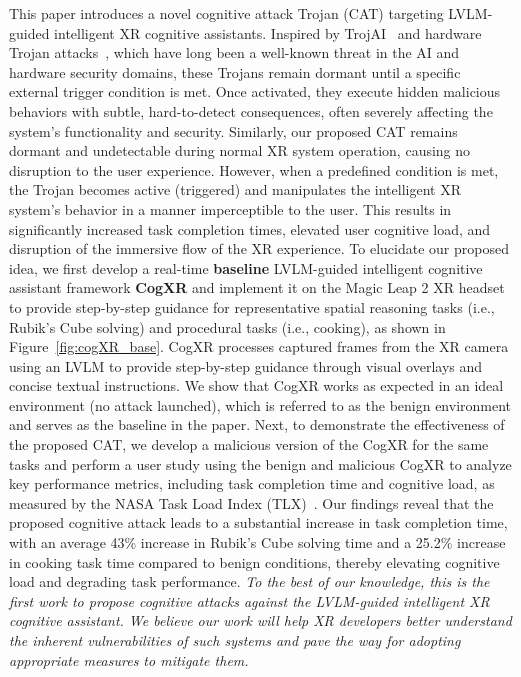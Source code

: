 \documentclass[sigconf,review,anonymous]{acmart}
\begin{document}
This paper introduces a novel cognitive attack Trojan (CAT) targeting LVLM-guided intelligent XR cognitive assistants. Inspired by TrojAI~\cite{reese2026trojans} and hardware Trojan attacks~\cite{gubbi2023hardware, bhunia2014hardware, king2008designing}, which have long been a well-known threat in the AI and hardware security domains, these Trojans remain dormant until a specific external trigger condition is met. Once activated, they execute hidden malicious behaviors with subtle, hard-to-detect consequences, often severely affecting the system’s functionality and security. Similarly, our proposed CAT remains dormant and undetectable during normal XR system operation, causing no disruption to the user experience. However, when a predefined condition is met, the Trojan becomes active (triggered) and manipulates the intelligent XR system’s behavior in a manner imperceptible to the user. This results in significantly increased task completion times, elevated user cognitive load, and disruption of the immersive flow of the XR experience. To elucidate our proposed idea, we first develop a real-time \textbf{baseline} LVLM-guided intelligent cognitive assistant framework \textbf{CogXR} and implement it on the Magic Leap 2 XR headset to provide step-by-step guidance for representative spatial reasoning tasks (i.e., Rubik's Cube solving) and procedural tasks (i.e., cooking), as shown in Figure~\ref{fig:cogXR_base}. CogXR processes captured frames from the XR camera using an LVLM to provide step-by-step guidance through visual overlays and concise textual instructions. We show that CogXR works as expected in an ideal environment (no attack 
launched), which is referred to as the benign environment and serves as the baseline in the paper. Next, to demonstrate the effectiveness of the proposed  CAT, we develop a malicious version of the CogXR for the same tasks and perform a user study using the benign and malicious CogXR to analyze key performance metrics, including task completion time and cognitive load, as measured by the NASA Task Load Index (TLX)~\cite{hart1988development}. Our findings reveal that the proposed cognitive attack leads to a substantial increase in task completion time, with an average 43\% increase in Rubik’s Cube solving time and a 25.2\% increase in cooking task time compared to benign conditions, thereby elevating cognitive load and degrading task performance. \emph{To the best of our knowledge, this is the first work to propose cognitive attacks against the LVLM-guided intelligent XR cognitive assistant. We believe our work will help XR developers better understand the inherent vulnerabilities of such systems and pave the way for adopting appropriate measures to mitigate them.}
\end{document}
